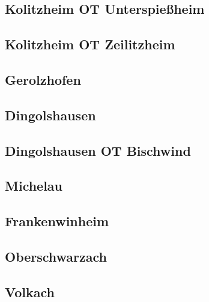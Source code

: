 \documentclass[fontsize=12pt,a4paper]{scrreprt}
\begin{document}
            \subsection{Kolitzheim OT Unterspießheim}
            

            \subsection{Kolitzheim OT Zeilitzheim}
            

            \subsection{Gerolzhofen}
            

            \subsection{Dingolshausen}
            

            \subsection{Dingolshausen OT Bischwind}
            

            \subsection{Michelau}
            
            
            \subsection{Frankenwinheim}
            

            \subsection{Oberschwarzach}
            

            \subsection{Volkach}
            
\end{document}
